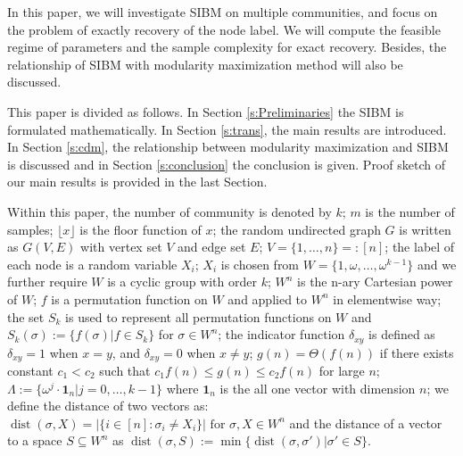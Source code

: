 \documentclass[conference]{IEEEtran}
\newcommand{\ide}[2]{ \delta_{#1 #2} }
\DeclareMathOperator{\dist}{dist}
\begin{document}
In this paper, we will investigate SIBM on multiple communities, and focus on the problem of exactly recovery of the node label.
We will compute the feasible regime of parameters and the sample complexity for exact recovery. Besides, the relationship of SIBM with modularity maximization method
will also be discussed. 

This paper is divided as follows. In Section \ref{s:Preliminaries} the SIBM is formulated mathematically.
In Section \ref{s:trans}, the main results are introduced.
In Section \ref{s:cdm}, the relationship between modularity maximization and SIBM is discussed 
and in Section \ref{s:conclusion} the conclusion is given.
Proof sketch of our main results is provided in the last Section.

Within this paper, the number of community is denoted by $k$; $m$ is the number of samples; $\lfloor x \rfloor$ is the floor function of $x$; the random undirected graph $G$ is written as $G(V,E)$ with vertex set $V$ and edge set $E$;
$V=\{1,\dots, n\} =: [n]$;
the label of each node is a random variable $X_i$; $X_i$ is chosen from $W= \{1, \omega, \dots, \omega^{k-1}\}$ and we further require $W$
is a cyclic group with order $k$; $W^n$ is the n-ary Cartesian power of $W$; $f$ is a permutation function on $W$ and applied to $W^n$ in elementwise way; the set $S_k$ is used to represent all permutation functions on $W$ and $S_k(\sigma):=\{f(\sigma)| f\in S_k\}$ for $\sigma \in W^n$; the indicator function $\ide{x}{y}$ is defined as
$\ide{x}{y} = 1 $ when $x=y$, and $\ide{x}{y}=0$ when $x\neq y$; $g(n) = \Theta(f(n))$ if there exists constant $c_1 < c_2$ such that $c_1 f(n) \leq g(n) \leq c_2 f(n)$
for large $n$;
$\Lambda := \{ \omega^j  \cdot \mathbf{1}_n | j=0, \dots,k-1\}$
where $\mathbf{1}_n$ is the all one vector with dimension $n$;
we define the distance of two vectors as:
$\dist(\sigma, X)
=|\{i\in[n]:\sigma_i\neq X_i\}| \textrm{ for } \sigma,X\in W^n
$ and the distance of a vector to a space $S\subseteq W^n$
as
$\dist(\sigma,S)
:=\min\{\dist(\sigma, \sigma') | \sigma' \in S\}
$.
\end{document}
